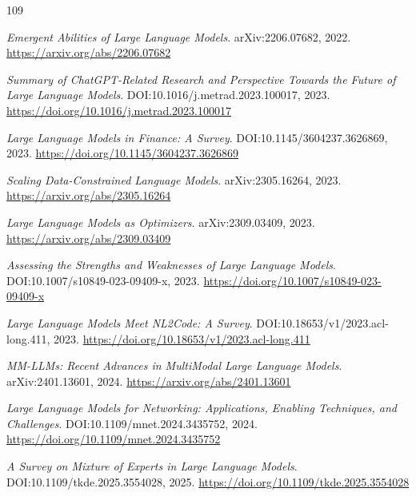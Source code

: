 \documentclass[11pt,a4paper]{article}
\begin{document}
\begin{thebibliography}{109}
\setlength{\itemsep}{2pt}

\newblock \emph{Emergent Abilities of Large Language Models}.
\newblock arXiv:2206.07682, 2022.
\newblock \url{https://arxiv.org/abs/2206.07682}

\newblock \emph{Summary of ChatGPT-Related Research and Perspective Towards the Future of Large Language Models}.
\newblock DOI:10.1016/j.metrad.2023.100017, 2023.
\newblock \url{https://doi.org/10.1016/j.metrad.2023.100017}

\newblock \emph{Large Language Models in Finance: A Survey}.
\newblock DOI:10.1145/3604237.3626869, 2023.
\newblock \url{https://doi.org/10.1145/3604237.3626869}

\newblock \emph{Scaling Data-Constrained Language Models}.
\newblock arXiv:2305.16264, 2023.
\newblock \url{https://arxiv.org/abs/2305.16264}

\newblock \emph{Large Language Models as Optimizers}.
\newblock arXiv:2309.03409, 2023.
\newblock \url{https://arxiv.org/abs/2309.03409}

\newblock \emph{Assessing the Strengths and Weaknesses of Large Language Models}.
\newblock DOI:10.1007/s10849-023-09409-x, 2023.
\newblock \url{https://doi.org/10.1007/s10849-023-09409-x}

\newblock \emph{Large Language Models Meet NL2Code: A Survey}.
\newblock DOI:10.18653/v1/2023.acl-long.411, 2023.
\newblock \url{https://doi.org/10.18653/v1/2023.acl-long.411}

\newblock \emph{MM-LLMs: Recent Advances in MultiModal Large Language Models}.
\newblock arXiv:2401.13601, 2024.
\newblock \url{https://arxiv.org/abs/2401.13601}

\newblock \emph{Large Language Models for Networking: Applications, Enabling Techniques, and Challenges}.
\newblock DOI:10.1109/mnet.2024.3435752, 2024.
\newblock \url{https://doi.org/10.1109/mnet.2024.3435752}

\newblock \emph{A Survey on Mixture of Experts in Large Language Models}.
\newblock DOI:10.1109/tkde.2025.3554028, 2025.
\newblock \url{https://doi.org/10.1109/tkde.2025.3554028}


\end{thebibliography}
\end{document}
